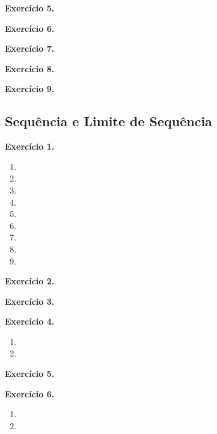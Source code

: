 \documentclass[12pt,a4paper]{article}
\begin{document}
\vspace{0.5cm}
\noindent\textbf{Exercício 5.}

\vspace{0.5cm}
\noindent\textbf{Exercício 6.}

\vspace{0.5cm}
\noindent\textbf{Exercício 7.}

\vspace{0.5cm}
\noindent\textbf{Exercício 8.}

\vspace{0.5cm}
\noindent\textbf{Exercício 9.}

\subsection{Sequência e Limite de Sequência}
\vspace{0.5cm}
\noindent\textbf{Exercício 1.}
\begin{enumerate}
    \renewcommand{\theenumi}{\alph{enumi}}
    \renewcommand{\labelenumi}{\theenumi)}
    \item 
    \item 
    \item 
    \item 
    \item 
    \item 
    \item 
    \item 
    \item 
\end{enumerate}

\vspace{0.5cm}
\noindent\textbf{Exercício 2.}

\vspace{0.5cm}
\noindent\textbf{Exercício 3.}

\vspace{0.5cm}
\noindent\textbf{Exercício 4.}
\begin{enumerate}
    \renewcommand{\theenumi}{\alph{enumi}}
    \renewcommand{\labelenumi}{\theenumi)}
    \item 
    \item 
\end{enumerate}

\vspace{0.5cm}
\noindent\textbf{Exercício 5.}

\vspace{0.5cm}
\noindent\textbf{Exercício 6.}
\begin{enumerate}
    \renewcommand{\theenumi}{\alph{enumi}}
    \renewcommand{\labelenumi}{\theenumi)}
    \item 
    \item 
\end{enumerate}
\end{document}
